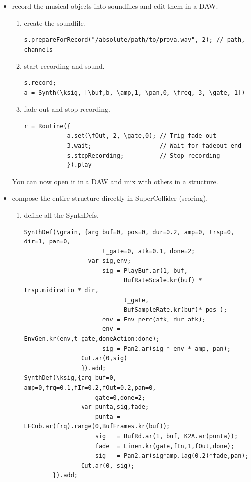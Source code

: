 \begin{itemize}
\tightlist
\item record the musical objects into soundfiles and edit them in a DAW.

\begin{enumerate}
\def\labelenumi{\arabic{enumi}.}
\tightlist

\item create the soundfile.
\begin{lstlisting}[frame=single] 
s.prepareForRecord("/absolute/path/to/prova.wav", 2); // path, channels
\end{lstlisting}

\item start recording and sound.
\begin{lstlisting}[frame=single] 
s.record;
a = Synth(\ksig, [\buf,b, \amp,1, \pan,0, \freq, 3, \gate, 1])
\end{lstlisting}

\item fade out and stop recording.
\begin{lstlisting}[frame=single, caption=Recording sound] 
r = Routine({
            a.set(\fOut, 2, \gate,0); // Trig fade out
            3.wait;                   // Wait for fadeout end
            s.stopRecording;          // Stop recording
            }).play
\end{lstlisting}
\end{enumerate}

You can now open it in a DAW and mix with others in a structure.


\item compose the entire structure directly in SuperCollider (scoring).

\begin{enumerate}
\def\labelenumi{\arabic{enumi}.}
\tightlist

\item define all the SynthDefs.
\begin{lstlisting}[frame=single] 
SynthDef(\grain, {arg buf=0, pos=0, dur=0.2, amp=0, trsp=0, dir=1, pan=0,
	                  t_gate=0, atk=0.1, done=2;
                  var sig,env;
                      sig = PlayBuf.ar(1, buf,
                            BufRateScale.kr(buf) * trsp.midiratio * dir,
                            t_gate,
                            BufSampleRate.kr(buf)* pos );
                      env = Env.perc(atk, dur-atk);
                      env = EnvGen.kr(env,t_gate,doneAction:done);
                      sig = Pan2.ar(sig * env * amp, pan);
                Out.ar(0,sig)
                }).add;
SynthDef(\ksig,{arg buf=0, amp=0,frq=0.1,fIn=0.2,fOut=0.2,pan=0,
                    gate=0,done=2;
                var punta,sig,fade;
                    punta = LFCub.ar(frq).range(0,BufFrames.kr(buf));   
                    sig   = BufRd.ar(1, buf, K2A.ar(punta));
                    fade  = Linen.kr(gate,fIn,1,fOut,done);
                    sig   = Pan2.ar(sig*amp.lag(0.2)*fade,pan);
                Out.ar(0, sig);
        }).add;
\end{lstlisting}


\end{enumerate}
\end{itemize}

